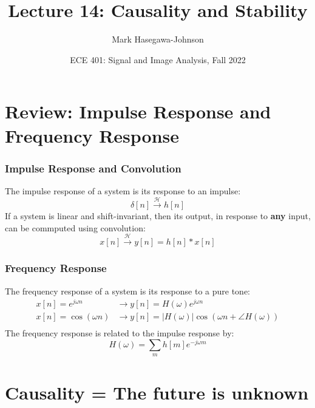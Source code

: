 \documentclass{beamer}
\title{Lecture 14: Causality and Stability}
\author{Mark Hasegawa-Johnson}
\date{ECE 401: Signal and Image Analysis, Fall 2022}
\begin{document}
\begin{frame}
  \maketitle
\end{frame}

\begin{frame}
  \tableofcontents
\end{frame}

\section[Review]{Review: Impulse Response and Frequency Response}
\setcounter{subsection}{1}

\begin{frame}
  \frametitle{Impulse Response and Convolution}

  The impulse response of a system is its response to an impulse:
  \begin{displaymath}
    \delta[n] \stackrel{\mathcal H}{\longrightarrow} h[n]
  \end{displaymath}
  If a system is linear and shift-invariant, then its output, in
  response to {\bf any} input, can be commputed  using convolution:
  \begin{displaymath}
    x[n] \stackrel{\mathcal H}{\longrightarrow} y[n]=h[n]\ast x[n]
  \end{displaymath}
\end{frame}

\begin{frame}
  \frametitle{Frequency Response}

  The frequency response of a system is its response to a pure tone:
  \begin{align*}
    x[n]=e^{j\omega n} &\rightarrow y[n]=H(\omega)e^{j\omega n}\\
    x[n]=\cos\left(\omega n\right)
    &\rightarrow y[n]=|H(\omega)|\cos\left(\omega n+\angle H(\omega)\right)\\
  \end{align*}
  The frequency response is related to the impulse response by:
  \[
  H(\omega) = \sum_m h[m]e^{-j\omega m}
  \]
\end{frame}  
        

\section[Causality]{Causality = The future is unknown}
\setcounter{subsection}{1}
\end{document}
